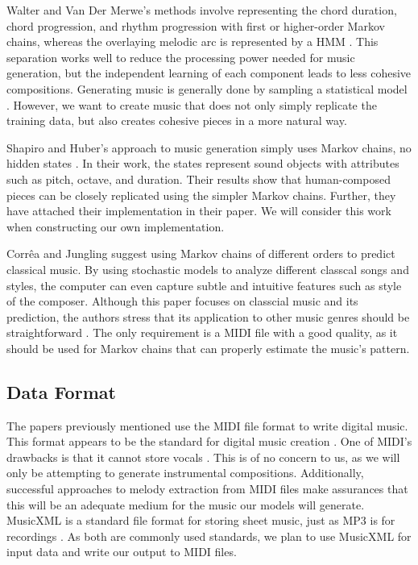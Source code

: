 \documentclass{article}
\begin{document}
Walter and Van Der Merwe's methods involve representing the chord duration, chord progression, and rhythm progression with first or higher-order Markov chains, whereas 
the overlaying melodic arc is represented by a HMM \cite{walter_2011}. This separation works well to reduce the processing power needed for music generation, but the 
independent learning of each component leads to less cohesive compositions. Generating music is generally done by sampling a statistical model \cite{conklin_2003}.
However, we want to create music that does not only simply replicate the training data, but also creates cohesive pieces in a more natural way. 

Shapiro and Huber's approach to music generation simply uses Markov chains, no hidden states \cite{shapiro_huber_2021}. In their work, the states represent sound 
objects with attributes such as pitch, octave, and duration. Their results show that human-composed pieces can be closely replicated using the simpler Markov chains. 
Further, they have attached their implementation in their paper. We will consider this work when constructing our own implementation.

Corrêa and Jungling suggest using Markov chains of different orders to predict classical music. By using stochastic models to analyze different classcal songs and styles,
the computer can even capture subtle and intuitive features such as style of the composer. Although this paper focuses on classcial music and its prediction, the authors 
stress that its application to other music genres should be straightforward \cite{correa_jungling_small_2020}.
The only requirement is a MIDI file with a good quality, as it should be used for Markov chains that can properly estimate the music's pattern.

\subsection{Data Format}
The papers previously mentioned use the MIDI file format to write digital music. This format appears to be the standard for digital music creation \cite{midi_format}. 
One of MIDI's drawbacks is that it cannot store vocals \cite{cataltepe_2007}. This is of no concern to us, as we will only be attempting to generate instrumental 
compositions. Additionally, successful approaches to melody extraction from MIDI files \cite{ozcan_2005} make assurances that this will be an adequate medium for the 
music our models will generate. MusicXML is a standard file format for storing sheet music, just as MP3 is for recordings \cite{musicxml_2022}. As both are commonly used 
standards, we plan to use MusicXML for input data and write our output to MIDI files.
\end{document}
